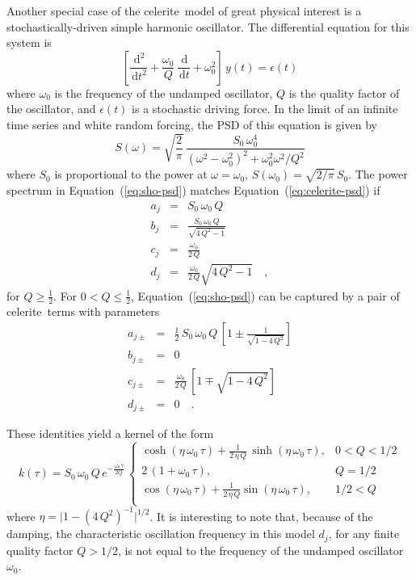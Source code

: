 \documentclass[manuscript, letterpaper]{aastex6}
\newcommand{\project}[1]{\textsf{#1}}
\newcommand{\celerite}{\project{celerite}}
\renewcommand{\eqref}[1]{\ref{eq:#1}}
\newcommand{\Eq}[1]{Equation~(\eqref{#1})}
\newcommand{\eq}[1]{\Eq{#1}}
\newcommand{\eqlabel}[1]{\label{eq:#1}}
\newcommand{\dd}{\ensuremath{\,\mathrm{d}}}
\begin{document}
Another special case of the \celerite\ model of great physical interest is a
stochastically-driven simple harmonic oscillator.
The differential equation for this system is
\begin{equation}
    \left[\frac{\dd^2}{\dd t^2} + \frac{\omega_0}{Q}\,\frac{\dd}{\dd t}
    + \omega_0^2\right]\, y(t) = \epsilon(t)
\end{equation}
where $\omega_0$ is the frequency of the undamped oscillator, $Q$ is the
quality factor of the oscillator, and $\epsilon(t)$ is a stochastic driving
force.
In the limit of an infinite time series and white random forcing, the PSD of
this equation is given by \citep{Anderson:1990}
\begin{equation}\eqlabel{sho-psd}
S(\omega) = \sqrt{\frac{2}{\pi}}\,\frac{S_0\,\omega_0^4}
    {(\omega^2-\omega_0^2)^2 + \omega_0^2\omega^2/Q^2}
\end{equation}
where $S_0$ is proportional to the power at $\omega = \omega_0$, $S(\omega_0)
= \sqrt{2/\pi}\,S_0$.
The power spectrum in \eq{sho-psd} matches \eq{celerite-psd} if
\begin{eqnarray}
a_j &=& S_0\,\omega_0\,Q \\
    b_j &=& \frac{S_0\,\omega_0\,Q}{\sqrt{4\,Q^2-1}} \\
c_j &=& \frac{\omega_0}{2\,Q}\\
d_j &=& \frac{\omega_0}{2\,Q} \sqrt{4\,Q^2-1} \quad,
\end{eqnarray}
for $Q \ge \frac{1}{2}$.
For $0 < Q \le \frac{1}{2}$, \eq{sho-psd} can be captured by a pair of \celerite\
terms with parameters
\begin{eqnarray}
a_{j\pm} &=& \frac{1}{2}\,S_0\,\omega_0\,Q\,\left[ 1 \pm
        \frac{1}{\sqrt{1-4\,Q^2}}\right] \\
b_{j\pm} &=& 0 \\
    c_{j\pm} &=& \frac{\omega_0}{2\,Q}\,\left[1 \mp \sqrt{1-4\,Q^2}\right] \\
d_{j\pm} &=& 0 \quad.
\end{eqnarray}

These identities yield a kernel of the form
\begin{equation}
k(\tau) = S_0\,\omega_0\,Q\,e^{-\frac{\omega_0\,\tau}{2Q}}\,
\begin{cases}
    \cosh{(\eta\,\omega_0\,\tau)} +
        \frac{1}{2\,\eta\,Q}\,\sinh{(\eta\,\omega_0\,\tau)}, & 0 < Q < 1/2\\
    2\,(1+\omega_0\,\tau), & Q = 1/2\\
    \cos{(\eta\,\omega_0\,\tau)} +
        \frac{1}{2\,\eta\,Q} \sin{(\eta\,\omega_0\,\tau)},& 1/2 < Q\\
\end{cases}
\end{equation}
where $\eta = \vert 1-(4\,Q^2)^{-1}\vert^{1/2}$.
It is interesting to note that, because of the damping, the characteristic
oscillation frequency in this model $d_j$, for any finite quality factor $Q > 1/2$,
is not equal to the frequency of the undamped oscillator $\omega_0$.
\end{document}
